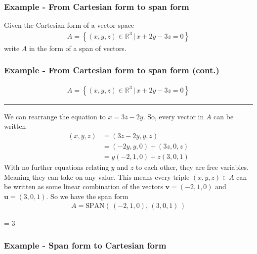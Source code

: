 \documentclass[usenames,dvipsnames,aspectratio=169,10pt]{beamer}
\def \EXAMPLEVERSION {1} %
\numberwithin{equation}{section}
\begin{document}
\begin{frame}
\frametitle{Example - From Cartesian form to span form}
Given the Cartesian form of a vector space
\begin{align*}
A = \left\{(x,y,z)\in\mathbb{R}^3 \, | \, x + 2y - 3z = 0\right\}
\end{align*}
write $A$ in the form of a span of vectors.
\end{frame}



\begin{frame}
\frametitle{Example - From Cartesian form to span form (cont.)}
\vspace{-0.5cm}
\begin{align*}
A = \left\{(x,y,z)\in\mathbb{R}^3 \, | \, x + 2y - 3z = 0\right\}
\end{align*}
\vspace{-1cm}\begin{center} \textcolor{airforceblue}{\rule{0.7\textwidth}{0.3mm}} \end{center}\vspace{-0.2cm}

We can rearrange the equation to $x=3z-2y$. So, every vector in $A$ can be written
\begin{align*}
(x,y,z) &= (3z-2y, y, z) \\
&= (-2y, y, 0) + (3z, 0, z) \\
&= y(-2, 1, 0) + z(3, 0, 1)
\end{align*}
With no further equations relating $y$ and $z$ to each other, they are free variables. Meaning they can take on any value. This means every triple $(x,y,z)\in A$ can be written as some linear combination of the vectors $\textbf{v}=(-2,1,0)$ and $\textbf{u}=(3,0,1)$. So we have the span form
\begin{align*}
A = \text{SPAN}( \, (-2,1,0), \, (3,0,1) \, )
\end{align*}

\end{frame}
\fi



\ifnum \EXAMPLEVERSION = 3
\begin{frame}
\frametitle{Example - Span form to Cartesian form}
\end{frame}
\end{document}
